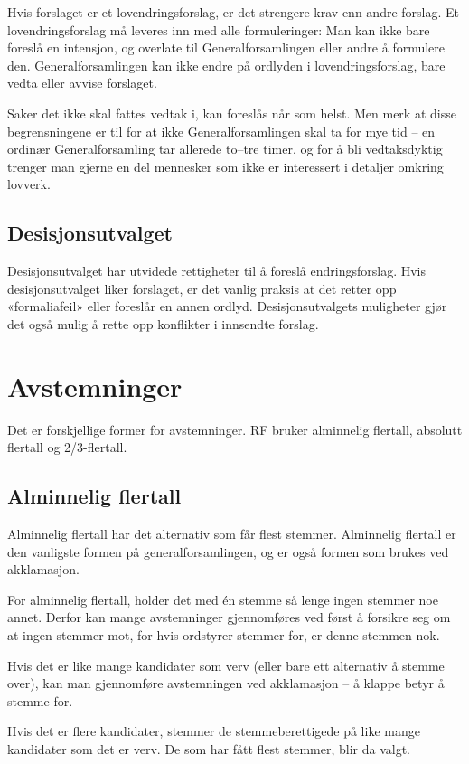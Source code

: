 Hvis forslaget er et lovendringsforslag, er det strengere krav enn andre forslag. Et lovendringsforslag
må leveres inn med alle formuleringer: Man kan ikke bare foreslå en intensjon, og overlate til
Generalforsamlingen eller andre å formulere den. Generalforsamlingen kan ikke endre på ordlyden
i lovendringsforslag, bare vedta eller avvise forslaget.

Saker det ikke skal fattes vedtak i, kan foreslås når som helst. Men merk at disse begrensningene
er til for at ikke Generalforsamlingen skal ta for mye tid – en ordinær Generalforsamling tar 
allerede to–tre timer, og for å bli vedtaksdyktig trenger man gjerne en del mennesker som
ikke er interessert i detaljer omkring lovverk.

\subsection{Desisjonsutvalget}
Desisjonsutvalget har utvidede rettigheter til å foreslå endringsforslag. Hvis desisjonsutvalget
liker forslaget, er det vanlig praksis at det retter opp «formaliafeil» eller foreslår en annen ordlyd.
Desisjonsutvalgets muligheter gjør det også mulig å rette opp konflikter i innsendte forslag.

\section{Avstemninger}
Det er forskjellige former for avstemninger. RF bruker alminnelig flertall, absolutt flertall
og 2/3-flertall.

\subsection{Alminnelig flertall}
Alminnelig flertall har det alternativ som får flest stemmer. Alminnelig flertall er den vanligste
formen på generalforsamlingen, og er også formen som brukes ved akklamasjon.

For alminnelig flertall, holder det med én stemme så lenge ingen stemmer noe annet. Derfor kan mange
avstemninger gjennomføres ved først å forsikre seg om at ingen stemmer mot, for hvis ordstyrer stemmer
for, er denne stemmen nok.

Hvis det er like mange kandidater som verv (eller bare ett alternativ å stemme over), kan man gjennomføre
avstemningen ved akklamasjon – å klappe betyr å stemme for.

Hvis det er flere kandidater, stemmer de stemmeberettigede på like mange kandidater som det er verv.
De som har fått flest stemmer, blir da valgt.

